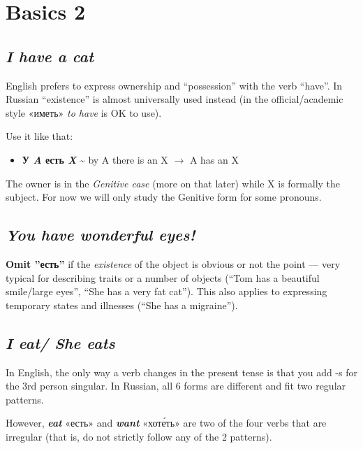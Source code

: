 \chapter{Basics 2}\label{basics-2}

\section{\texorpdfstring{\emph{I \textbf{have} a
cat}}{I have a cat}}\label{i-have-a-cat}

English prefers to express ownership and ``possession'' with the verb
``have''. In Russian ``existence'' is almost universally used instead
(in the official/academic style «иметь» \emph{to have} is OK to use).

Use it like that:

\begin{itemize}
\tightlist
\item
  \textbf{У \emph{A} есть \emph{X}} \textasciitilde{} by A there is an X
  $ \rightarrow$ A has an X
\end{itemize}

The owner is in the \emph{Genitive case} (more on that later) while X is
formally the subject. For now we will only study the Genitive form for
some pronouns.

\section{\texorpdfstring{\emph{You \textbf{have} wonderful
eyes!}}{You have wonderful eyes!}}\label{you-have-wonderful-eyes}

\textbf{Omit ''есть''} if the \emph{existence} of the object is obvious
or not the point --- very typical for describing traits or a number of
objects (``Tom has a beautiful smile/large eyes'', ``She has a very fat
cat''). This also applies to expressing temporary states and illnesses
(``She has a migraine'').

\section{\texorpdfstring{\emph{I eat/ She
eat\textbf{s}}}{I eat/ She eats}}\label{i-eat-she-eats}

In English, the only way a verb changes in the present tense is that you
add -s for the 3rd person singular. In Russian, all 6 forms are
different and fit two regular patterns.

However, \textbf{\emph{eat}} «есть» and \textbf{\emph{want}} «хот\'{е}ть»
are two of the four verbs that are irregular (that is, do not strictly
follow any of the 2 patterns).

